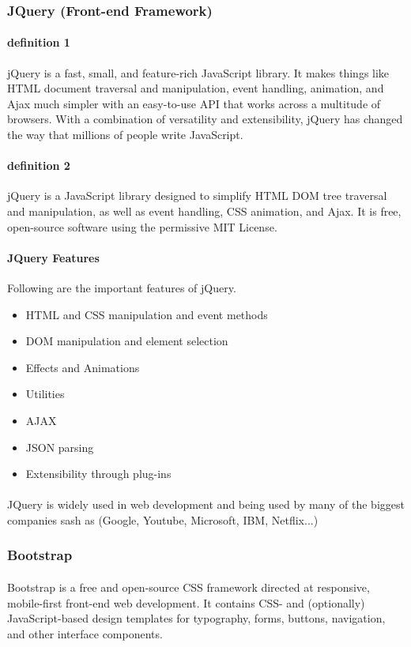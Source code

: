 \documentclass{article}
\begin{document}
	\subsubsection{JQuery (Front-end Framework)}
	\paragraph{definition 1}
	jQuery is a fast, small, and feature-rich JavaScript library. It makes things like HTML document traversal and manipulation, event handling, animation, and Ajax much simpler with an easy-to-use API that works across a multitude of browsers. With a combination of versatility and extensibility, jQuery has changed the way that millions of people write JavaScript.
	\paragraph{definition 2}
	jQuery is a JavaScript library designed to simplify HTML DOM tree traversal and manipulation, as well as event handling, CSS animation, and Ajax. It is free, open-source software using the permissive MIT License.
	\paragraph{JQuery Features}
	Following are the important features of jQuery.
	\begin{itemize}
		\item HTML and CSS manipulation and event methods
		\item DOM manipulation and element selection
		\item Effects and Animations
		\item Utilities
		\item AJAX
		\item JSON parsing
		\item Extensibility through plug-ins
	\end{itemize}
	\paragraph{}
	JQuery is widely used in web development and being used by many of the biggest companies sash as (Google, Youtube, Microsoft, IBM, Netflix...)
	\subsubsection{Bootstrap}
	\paragraph{}
	Bootstrap is a free and open-source CSS framework directed at responsive, mobile-first front-end web development. It contains CSS- and (optionally) JavaScript-based design templates for typography, forms, buttons, navigation, and other interface components.
\end{document}

